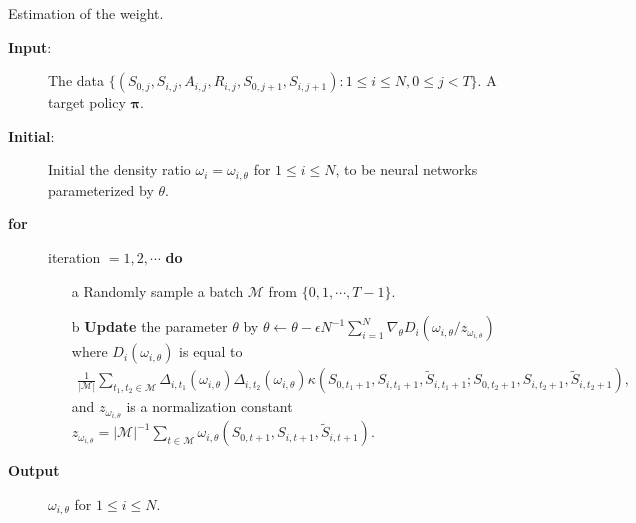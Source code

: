 \documentclass{article}
\begin{document}
\begin{algorithm}[t!]
	\caption{Estimation of the weight.}
	\label{alg1}
	\begin{algorithmic}
		\item
		\begin{description}
			\item[\textbf{Input}:] The data $\{(S_{0,j},S_{i,j},A_{i,j},R_{i,j},S_{0,j+1},S_{i,j+1}):1\le i\le N,0\le j< T\}$. A target policy $\bm{\pi}$. 
			
			\item[\textbf{Initial}:] Initial the density ratio $\omega_i=\omega_{i,\theta}$ for $1\le i\le N$, to be neural networks parameterized by $\theta$.
			
			\item[\textbf{for}] iteration $=1,2,\cdots$ \textbf{do}
			\begin{enumerate}
				\item[a] Randomly sample a batch $\mathcal{M}$ from $\{0,1,\cdots,T-1\}$.
				
				\item[b] {\textbf{Update}} the parameter $\theta$ by $\theta\leftarrow \theta-\epsilon N^{-1}\sum_{i=1}^N \nabla_{\theta} D_i(\omega_{i,\theta}/z_{\omega_{i,\theta}})$ where $D_i(\omega_{i,\theta})$ is equal to
				\begin{eqnarray*}
					\frac{1}{|\mathcal{M}|}\sum_{t_1,t_2\in \mathcal{M}}  \Delta_{i,t_1}(\omega_{i,\theta})\Delta_{i,t_2}(\omega_{i,\theta}) \kappa(S_{0,t_1+1},S_{i,t_1+1},\widetilde{S}_{i,t_1+1};S_{0,t_2+1},S_{i,t_2+1},\widetilde{S}_{i,t_2+1}),
				\end{eqnarray*}
				and $z_{\omega_{i,\theta}}$ is a normalization constant $z_{\omega_{i,\theta}}=|\mathcal{M}|^{-1} \sum_{t\in \mathcal{M}} \omega_{i,\theta}(S_{0,t+1},S_{i,t+1},\widetilde{S}_{i,t+1})$. 
			\end{enumerate}
			\item[\textbf{Output}] $\omega_{i,\theta}$ for $1\le i\le N$. 
		\end{description}
	\end{algorithmic}
\end{algorithm}
\end{document}

